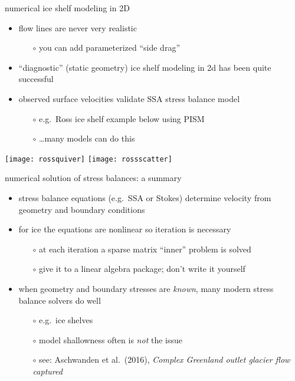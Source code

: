 \begin{frame}{numerical ice shelf modeling in 2D}

\begin{itemize}
\item flow lines are never very realistic
  \begin{itemize}
  \item[$\circ$] you can add parameterized ``side drag''
  \end{itemize}
\item ``diagnostic'' (static geometry) ice shelf modeling in 2d has been quite successful
\item observed surface velocities validate SSA stress balance model
  \begin{itemize}
  \item[$\circ$] e.g.~Ross ice shelf example below using PISM
  \item[$\circ$] \dots many models can do this
  \end{itemize}
\end{itemize}

\begin{center}
\texttt{[image: rossquiver]}  \hfill  \texttt{[image: rossscatter]}
\end{center}
\end{frame}


\begin{frame}{numerical solution of stress balances: a summary}

\begin{itemize}
\item stress balance equations (e.g.~SSA or Stokes) determine velocity from geometry and boundary conditions
\item for ice the equations are nonlinear so iteration is necessary
  \begin{itemize}
  \item[$\circ$] at each iteration a sparse matrix ``inner'' problem is solved
  \item[$\circ$] give it to a linear algebra package; don't write it yourself
  \end{itemize}
\item when geometry and boundary stresses are \emph{known}, many modern stress balance solvers do well
  \begin{itemize}
  \item[$\circ$] e.g.~ice shelves
  \item[$\circ$] model shallowness often is \emph{not} the issue
  \item[$\circ$] see: Aschwanden et al.~(2016), \emph{Complex Greenland outlet glacier flow captured}
  \end{itemize}
\end{itemize}
\end{frame}



